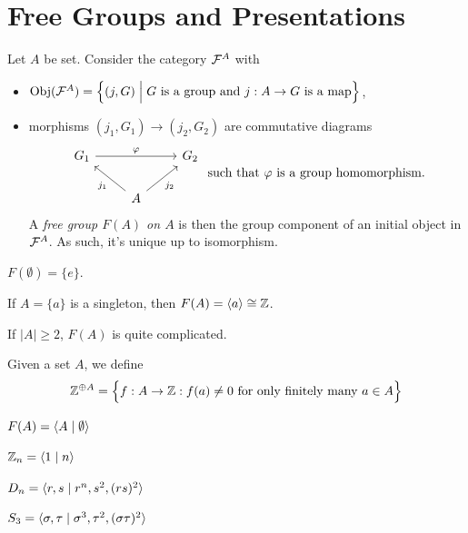 \section{Free Groups and Presentations}

\begin{definition}
  Let \(A\) be set. Consider the category \(\cal{F}^A\) with \begin{itemize}
    \item \(\Obj(\mathcal{F}^A) = \Big\{(j, G) \Bigm| G\text{ is a group and } j:A\to G\text{ is a map}\Big\}\),
    \item morphisms \((j_1,G_1)\longrightarrow (j_2,G_2)\) are commutative diagrams \[
      \begin{tikzcd}
        G_1 \ar{rr}{\f} & & G_2 \\
        &A \ar{ul}{j_1} \ar{ur}[swap]{j_2}
      \end{tikzcd}
      \text{ such that } \f \text{ is a group homomorphism.}
    \]
    A \emph{free group \(F(A)\) on \(A\)} is then the group component of an initial object in \(\cal{F}^A\). As such, it's unique up to isomorphism.
  \end{itemize}
\end{definition}

\begin{example}
  \(F(\emptyset) = \{e\}\).
\end{example}

\begin{example}
  If \(A = \{a\}\) is a singleton, then \(F(A) = \<a\> \cong \Z\).
\end{example}

If \(|A|\geq 2\), \(F(A)\) is quite complicated.

\begin{definition}
  Given a set \(A\), we define \[
    \Z^{\oplus A} = \Big\{
      f: A\to \Z : f(a)\neq 0\text{ for only finitely many } a\in A  
    \Big\}
  \]
\end{definition}

\begin{example}
  \(F(A) = \< A \mid \emptyset \>\)
\end{example}

\begin{example}
  \(\Z_n = \< 1 \mid n\>\)
\end{example}

\begin{example}
  \(D_n = \< r, s \mid r^n, s^2, (rs)^2\>\)
\end{example}

\begin{example}
  \(S_3 = \< \sgm,\tau \mid \sgm^3, \tau^2, (\sgm\tau)^2 \>\)
\end{example}